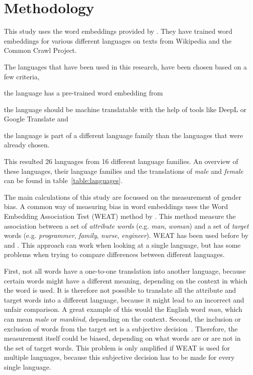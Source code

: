 \section{Methodology}
This study uses the word embeddings provided by \textcite{grave2018learning}. They have
trained word embeddings for various different languages on texts from Wikipedia and
the Common Crawl Project.

The languages that have been used in this research, have been chosen based on a
few criteria,
\begin{seriate}
    \item the language has a pre-trained word embedding from \textcite{grave2018learning}
    \item the language should be machine translatable with the help of tools like DeepL or
    Google Translate and
    \item the language is part of a different language family than the languages that
    were already chosen.
\end{seriate}
This resulted 26 languages from 16 different language families. An overview of these languages, their language families and the translations of \textit{male} and \textit{female}
can be found in table~\ref{table:languages}.

The main calculations of this study are focussed on the measurement of gender bias.
A common way of measuring bias in word embeddings uses the 
Word Embedding Association Test (WEAT) method by
\textcite{caliskan_2017_semantics_language_corpora}. This method measure the
association between a set of \textit{attribute words} (e.g. \textit{man}, \textit{woman}) 
and a set of \textit{target} words (e.g. \textit{programmer}, \textit{family},
\textit{nurse}, \textit{engineer}).
WEAT has been used before by \textcite{gonen-goldberg-2019-lipstick-pig}
and \textcite{10.1145/3306618.3314270}.
This approach can work when looking at a single language, but has some problems when
trying to compare differences between different languages.

First, not all words have a one-to-one translation into another
language, because certain words might have a different meaning, depending on the
context in which the word is used. It is therefore not possible to translate all the
attribute and target words into a different language, because it might lead to an
incorrect and unfair comparison. A great example of this would the English word
\textit{man}, which can mean \textit{male} or \textit{mankind}, depending on the context.
Second, the inclusion or exclusion of words from
the target set is a subjective decision~\parencite{nissim_fair_is_better_2020}. Therefore,
the measurement itself could be biased, depending on what words are or are not in the set
of target words. This problem is only amplified if WEAT is used for multiple languages,
because this subjective decision has to be made for every single language.

